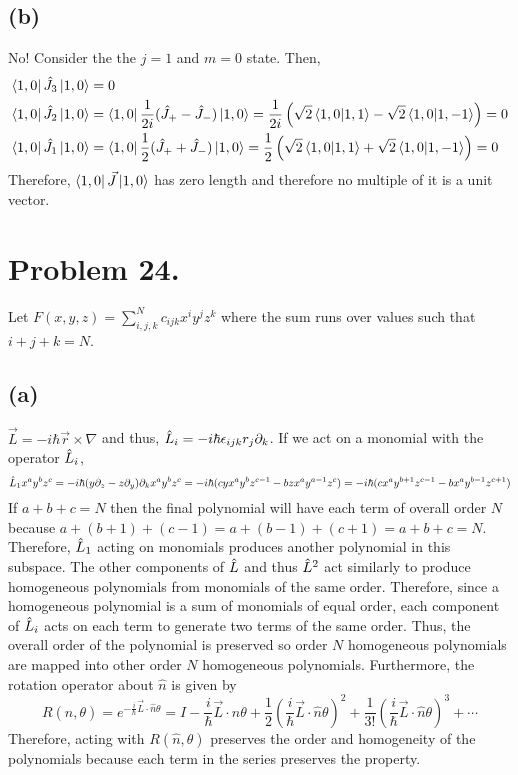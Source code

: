 \documentclass[12pt]{extarticle}
\begin{document}
\subsection*{(b)}

No! Consider the the $j = 1$ and $m = 0$ state. Then, 
\begin{align*}
\left< 1, 0 \right| \hat{J}_3 \left| 1, 0 \right> & = 0 \\
\left< 1, 0 \right| \hat{J}_2 \left| 1, 0 \right> & = \left< 1, 0 \right| \frac{1}{2i}(\hat{J}_{+} - \hat{J}_{-}) \left| 1, 0 \right> = \frac{1}{2i} \left( \sqrt{2} \left< 1, 0 | 1,1 \right> - \sqrt{2} \left< 1, 0 | 1, -1 \right> \right) = 0 \\
\left< 1, 0 \right| \hat{J}_1 \left| 1, 0 \right> & = \left< 1, 0 \right| \frac{1}{2}(\hat{J}_{+} + \hat{J}_{-}) \left| 1, 0 \right> = \frac{1}{2} \left( \sqrt{2} \left< 1, 0 | 1,1 \right> + \sqrt{2} \left< 1, 0 | 1, -1 \right> \right) = 0 
\end{align*}
Therefore, $\left< 1, 0 \right| \vec{J} \left| 1, 0 \right>$ has zero length and therefore no multiple of it is a unit vector. 

\section*{Problem 24.}

Let $F(x, y, z) = \sum\limits_{i, j, k}^N c_{ijk} x^i y^j z^k$ where the sum runs over values such that $i + j + k = N$. 

\subsection*{(a)}

$\vec{L} = - i \hbar \vec{r} \times \nabla$ and thus, $\hat{L}_i = - i \hbar \epsilon_{ijk} r_j \partial_k$. If we act on a monomial with the operator $\hat{L}_i$,
\[ \hat{L}_1 x^a y^b z^c = - i \hbar (y \partial_z - z \partial_y) \partial_k x^a y^b z^c = - i \hbar (c y x^a y^b z^{c-1} - b z x^a y^{a-1} z^c) = - i \hbar (c x^a y^{b + 1} z^{c - 1} - b x^a y^{b - 1} z^{c + 1}) \]    
If $a + b + c = N$ then the final polynomial will have each term of overall order $N$ because $a + (b + 1) + (c - 1) = a + (b - 1) + (c + 1) = a + b + c = N$. Therefore, $\hat{L}_1$ acting on monomials produces another polynomial in this subspace. The other components of $\hat{L}$ and thus $\hat{L}^2$ act similarly to produce homogeneous polynomials from monomials of the same order. Therefore, since a homogeneous polynomial is a sum of monomials of equal order, each component of $\hat{L}_i$ acts on each term to generate two terms of the same order. Thus, the overall order of the polynomial is preserved so order $N$ homogeneous polynomials are mapped into other order $N$ homogeneous polynomials. Furthermore, the rotation operator about $\hat{n}$ is given by  
\[R(\hat{n}, \theta) = e^{- \frac{i}{\hbar} \vec{L} \cdot \hat{n} \theta} = I - \frac{i}{\hbar} \vec{L} \cdot \hat{n} \theta + \frac{1}{2} \left(\frac{i}{\hbar} \vec{L} \cdot \hat{n} \theta \right)^2 + \frac{1}{3!} \left(\frac{i}{\hbar} \vec{L} \cdot \hat{n} \theta \right)^3 + \cdots  \]
Therefore, acting with $R(\hat{n}, \theta)$ preserves the order and homogeneity of the polynomials because each term in the series preserves the property.    
\end{document}
